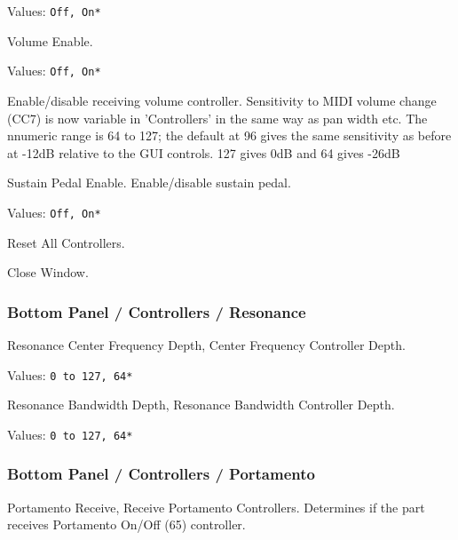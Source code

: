    Values: \texttt{Off, On*}

   Volume Enable.

   Values: \texttt{Off, On*}

   Enable/disable receiving volume controller.
   Sensitivity to MIDI volume change (CC7) is now variable in 'Controllers'
   in the same way as pan width etc. The nnumeric range is 64 to 127; the
   default at 96 gives the same sensitivity as before at -12dB relative to
   the GUI controls. 127 gives 0dB and 64 gives -26dB

   Sustain Pedal Enable.
   Enable/disable sustain pedal.

   Values: \texttt{Off, On*}

   Reset All Controllers.

   Close Window.

\subsubsection{Bottom Panel / Controllers / Resonance}
\label{subsubsec:bottom_panel_controllers_resonance}

   \setcounter{ItemCounter}{0}      %

   Resonance Center Frequency Depth,
   Center Frequency Controller Depth.

   Values: \texttt{0 to 127, 64*}

   Resonance Bandwidth Depth,
   Resonance Bandwidth Controller Depth.

   Values: \texttt{0 to 127, 64*}

\subsubsection{Bottom Panel / Controllers / Portamento}
\label{subsubsec:bottom_panel_controllers_portamento}

   \setcounter{ItemCounter}{0}      %

   Portamento Receive,
   Receive Portamento Controllers.
   Determines if the part receives Portamento On/Off (65) controller.

